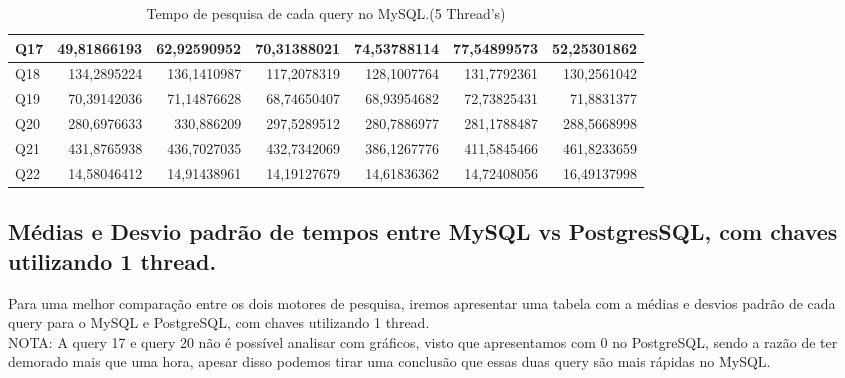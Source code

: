 \documentclass{article}
\begin{document}
\begin{table}[H]
{\begin{tabular}{|l|r|r|r|r|r|r|}
        Q17	&49,81866193&	62,92590952	&70,31388021	&74,53788114&	77,54899573&	52,25301862\\ \hline
        Q18	&134,2895224&	136,1410987	&117,2078319	&128,1007764&	131,7792361	&130,2561042\\ \hline
        Q19	&70,39142036&	71,14876628	&68,74650407	&68,93954682&	72,73825431	&71,8831377\\ \hline
        Q20	&280,6976633&	330,886209&	297,5289512	&280,7886977&	281,1788487&	288,5668998\\ \hline
        Q21	&431,8765938&	436,7027035	&432,7342069&	386,1267776&	411,5845466	&461,8233659\\ \hline
        Q22	&14,58046412&	14,91438961	&14,19127679	&14,61836362&	14,72408056	&16,49137998 \\ \hline
 \end{tabular}}
    \caption{Tempo de pesquisa de cada query no MySQL.(5 Thread's)}
    \label{tab:BC_Table6}
  \end{table}

\subsection{Médias e Desvio padrão de tempos entre MySQL vs PostgresSQL, com chaves utilizando 1 thread.}

\texttt{}\par Para uma melhor comparação entre os dois motores de pesquisa, iremos apresentar uma tabela com a médias e desvios padrão de cada query para o MySQL e PostgreSQL, com chaves utilizando 1 thread. \\
NOTA: A query 17 e query 20 não é possível analisar com gráficos, visto que apresentamos com 0 no PostgreSQL, sendo a razão de ter demorado mais que uma hora, apesar disso podemos tirar uma conclusão que essas duas query são mais rápidas no MySQL.
\end{document}

